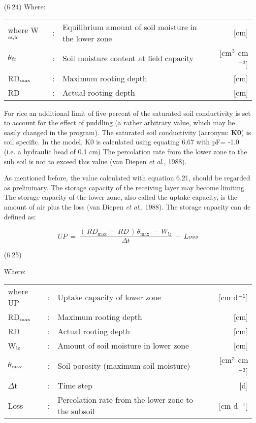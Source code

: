  
\strut\hfill (6.24)
Where:\\
\begin{tabularx}{\textwidth}{llXr}



where W$_{{\rm rz,fc}}$ &:& Equilibrium amount of soil moisture in the lower zone  & [cm]\\
$\theta$$_{{\rm fc}}$ &:& Soil moisture content at field capacity  & [cm$^{{\rm 3}}$ cm$^{{\rm -3}}$]\\
RD$_{{\rm max}}$ &:& Maximum rooting depth  & [cm]\\
RD &:& Actual rooting depth  & [cm]
\end{tabularx}
 For rice an addi\-tional limit of five percent of the saturated soil conductivity is set to
account for the effect of puddling (a rather arbitrary value, which may be easily changed
in the program). The saturated soil conductivity (acronym: {\bf K0}) is soil specific. In the
model, K0 is calculated using equating 6.67 with pF= -1.0 (i.e. a hydraulic head of 0.1
cm) The percolation rate from the lower zone to the sub soil is not to exceed this value
(van Diepen {\it et al\/}., 1988). 



As mentioned before, the value calculated with equation 6.21, should be regarded as
preliminary. The storage capacity of the receiving layer may become limiting. The
storage capacity of the lower zone, also called the uptake capacity, is the amount of air
plus the loss (van Diepen {\it et al\/}., 1988). The storage capacity can de defined as:

\begin{equation}
UP  ~=~{\frac{(\, RD _{\max } \, -\, RD\, )\, \theta  _{\max } ~-~ W _{lz} }{\Delta t}} ~+~ Loss
\end{equation}

 
\strut\hfill (6.25)

Where:\\
\begin{tabularx}{\textwidth}{llXr}



where UP &:& Uptake capacity of lower zone  & [cm d$^{{\rm -1}}$]\\
RD$_{{\rm max}}$ &:& Maximum rooting depth  & [cm]\\
RD &:& Actual rooting depth  & [cm]\\
W$_{{\rm lz}}$ &:& Amount of soil moisture in lower zone  & [cm]\\
$\theta$$_{{\rm max}}$ &:& Soil porosity (maximum soil moisture)  & [cm$^{{\rm 3}}$ cm$^{{\rm -3}}$]\\
$\Delta$t &:& Time step  & [d]\\
Loss &:& Percolation rate from the lower zone to the subsoil   & [cm d$^{{\rm -1}}$]
\end{tabularx}

